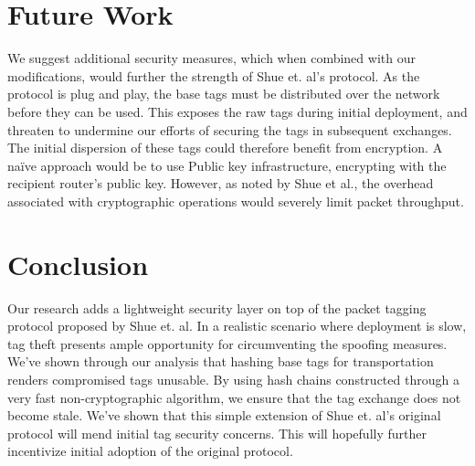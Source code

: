 \documentclass[12pt]{article} %
\begin{document}

\newpage %



\section{Future Work}

We suggest additional security measures, which when combined with our modifications, would further the strength of Shue et. al's protocol. As the protocol is plug and play, the base tags must be distributed over the network before they can be used. This exposes the raw tags during initial deployment, and threaten to undermine our efforts of securing the tags in subsequent exchanges. The initial dispersion of these tags could therefore benefit from encryption. A na\"{i}ve approach would be to use Public key infrastructure, encrypting with the recipient router's public key. However, as noted by Shue et al., the overhead associated with cryptographic operations would severely limit packet throughput. 

\section{Conclusion}

Our research adds a lightweight security layer on top of the packet tagging protocol proposed by Shue et. al. In a realistic scenario where deployment is slow, tag theft presents ample opportunity for circumventing the spoofing measures. We've shown through our analysis that hashing base tags for transportation renders compromised tags unusable. By using hash chains constructed through a very fast non-cryptographic algorithm, we ensure that the tag exchange does not become stale. We've shown that this simple extension of Shue et. al's original protocol will mend initial tag security concerns. This will hopefully further incentivize initial adoption of the original protocol.





%
%

\end{document}

